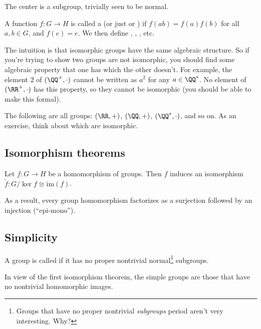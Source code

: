 The center is a subgroup, trivially seen to be normal.

\begin{definition}
A function $f : G \to H$ is called a  (or just  or ) if $f(ab) = f(a)f(b)$ for all $a,b \in G$, and $f(e) = e$. We then define , , , etc.
\end{definition}

The intuition is that isomorphic groups have the same algebraic structure. So if you're trying to show two groups are not isomorphic, you should find some algebraic property that one has which the other doesn't. For example, the element $2$ of $(\QQ^+, \cdot)$ cannot be written as $a^2$ for any $a \in \QQ^*$. No element of $(\RR^+, \cdot)$ has this property, so they cannot be isomorphic (you should be able to make this formal).


\begin{example}
The following are all groups: $(\RR, +)$, $(\QQ, +)$, $(\QQ^*, \cdot)$, and so on. As an exercise, think about which are isomorphic.
\end{example}

\subsection{Isomorphism theorems}

\begin{theorem}
Let $f : G \to H$ be a homomorphism of groups. Then $f$ induces an isomorphism $\tilde{f} : G/\ker f \cong \mathrm{im}(f)$.
\end{theorem}

As a result, every group homomorphism factorizes as a surjection followed by an injection (``epi-mono'').

\subsection{Simplicity}

\begin{definition}
A group is called  if it has no proper nontrivial normal\footnote{Groups that have no proper nontrivial \emph{subgroups} period aren't very interesting. Why?} subgroups.
\end{definition}

In view of the first isomorphism theorem, the simple groups are those that have no nontrivial homomorphic images.

